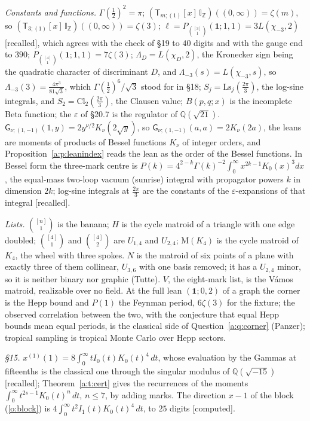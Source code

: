 \documentclass[11pt]{article}
\newcommand{\one}{\mathbf 1}
\newcommand{\sG}{\mathsf G}
\newcommand{\sT}{\mathsf T}
\newcommand{\IZ}{\mathbb I_{\mathbb Z}}
\newcommand{\Tx}[3]{(\sT_{#1;(1)}[x]\,#2)((#3,\infty))}
\newcommand{\Pth}{P_{\binom{[3]}1}(\one;1,1)}
\newcommand{\Pfour}{P_{\binom{[4]}1}(\one;1,1)}
\newcommand{\Zt}{\Tx3{\IZ}0}
\theoremstyle{plain}
\theoremstyle{definition}
\theoremstyle{remark}
\newcommand{\computed}{\textup{[computed]}}
\newcommand{\recalled}{\textup{[recalled]}}
\begin{document}
\noindent\emph{Constants and functions.} $\Gamma(\frac12)^2=\pi$; $\Tx m{\IZ}0=\zeta(m)$, so $\Zt=\zeta(3)$; $\ell=\Pth=3L(\chi_{-3},2)$ \recalled, which agrees with the check of \S19 to $40$ digits and with the gauge end to $390$; $\Pfour=7\zeta(3)$; $\Lambda_D=L(\chi_D,2)$, the Kronecker sign being the quadratic character of discriminant $D$, and $\Lambda_{-3}(s)=L(\chi_{-3},s)$, so $\Lambda_{-3}(3)=\frac{4\pi^3}{81\sqrt3}$, which $\Gamma(\frac12)^6/\sqrt3$ stood for in \S18; $S_j=\mathrm{Ls}_j(\frac{2\pi}3)$, the log-sine integrals, and $S_2=\mathrm{Cl}_2(\frac{2\pi}3)$, the Clausen value; $B(p,q;x)$ is the incomplete Beta function; the $\varepsilon$ of \S20.7 is the regulator of $\mathbb Q(\sqrt{21})$. $\sG_{\nu;(1,-1)}(1,y)=2y^{\nu/2}K_\nu(2\sqrt y)$, so $\sG_{\nu;(1,-1)}(a,a)=2K_\nu(2a)$, the leans are moments of products of Bessel functions $K_\nu$ of integer orders, and Proposition~\ref{a:p:leanindex} reads the lean as the order of the Bessel functions. In Bessel form the three-mark centre is $P(k)=4^{2-k}\Gamma(k)^{-2}\int_0^\infty x^{2k-1}K_0(x)^3dx$, the equal-mass two-loop vacuum (sunrise) integral with propagator powers $k$ in dimension $2k$; log-sine integrals at $\frac{2\pi}3$ are the constants of the $\varepsilon$-expansions of that integral \recalled.

\noindent\emph{Lists.} $\binom{[n]}1$ is the banana; $H$ is the cycle matroid of a triangle with one edge doubled; $\binom{[4]}1$ and $\binom{[4]}2$ are $U_{1,4}$ and $U_{2,4}$; $\mathrm M(K_4)$ is the cycle matroid of $K_4$, the wheel with three spokes. $N$ is the matroid of six points of a plane with exactly three of them collinear, $U_{3,6}$ with one basis removed; it has a $U_{2,4}$ minor, so it is neither binary nor graphic (Tutte). $V$, the eight-mark list, is the V\'amos matroid, realizable over no field. At the full lean $(\one;0,2)$ of a graph the corner is the Hepp bound and $P(1)$ the Feynman period, $6\zeta(3)$ for the fixture; the observed correlation between the two, with the conjecture that equal Hepp bounds mean equal periods, is the classical side of Question~\ref{a:q:corner} (Panzer); tropical sampling is tropical Monte Carlo over Hepp sectors.

\noindent\emph{\S15.} $x^{(1)}(1)=8\int_0^\infty tI_0(t)K_0(t)^4\,dt$, whose evaluation by the Gammas at fifteenths is the classical one through the singular modulus of $\mathbb Q(\sqrt{-15})$ \recalled; Theorem~\ref{a:t:cert} gives the recurrences of the moments $\int_0^\infty t^{2s-1}K_0(t)^n\,dt$, $n\le7$, by adding marks. The direction $x-1$ of the block (\ref{o:block}) is $4\int_0^\infty t^2I_1(t)K_0(t)^4\,dt$, to $25$ digits \computed.
\end{document}
